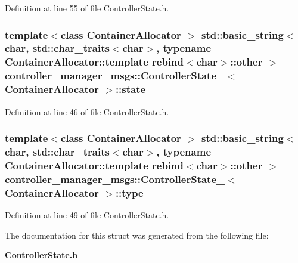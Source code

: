 \-Definition at line 55 of file \-Controller\-State.\-h.

\subsubsection[{state}]{\setlength{\rightskip}{0pt plus 5cm}template$<$class Container\-Allocator $>$ std\-::basic\-\_\-string$<$char, std\-::char\-\_\-traits$<$char$>$, typename \-Container\-Allocator\-::template rebind$<$char$>$\-::other $>$ {\bf controller\-\_\-manager\-\_\-msgs\-::\-Controller\-State\-\_\-}$<$ \-Container\-Allocator $>$\-::{\bf state}}\label{structcontroller__manager__msgs_1_1ControllerState___a11d8490ba653e3afd549eb90ffe6dd08}


\-Definition at line 46 of file \-Controller\-State.\-h.

\subsubsection[{type}]{\setlength{\rightskip}{0pt plus 5cm}template$<$class Container\-Allocator $>$ std\-::basic\-\_\-string$<$char, std\-::char\-\_\-traits$<$char$>$, typename \-Container\-Allocator\-::template rebind$<$char$>$\-::other $>$ {\bf controller\-\_\-manager\-\_\-msgs\-::\-Controller\-State\-\_\-}$<$ \-Container\-Allocator $>$\-::{\bf type}}\label{structcontroller__manager__msgs_1_1ControllerState___a46d1d123199a53580128988fddec7a1e}


\-Definition at line 49 of file \-Controller\-State.\-h.



\-The documentation for this struct was generated from the following file\-:\begin{DoxyCompactItemize}
\item 
{\bf \-Controller\-State.\-h}\end{DoxyCompactItemize}
